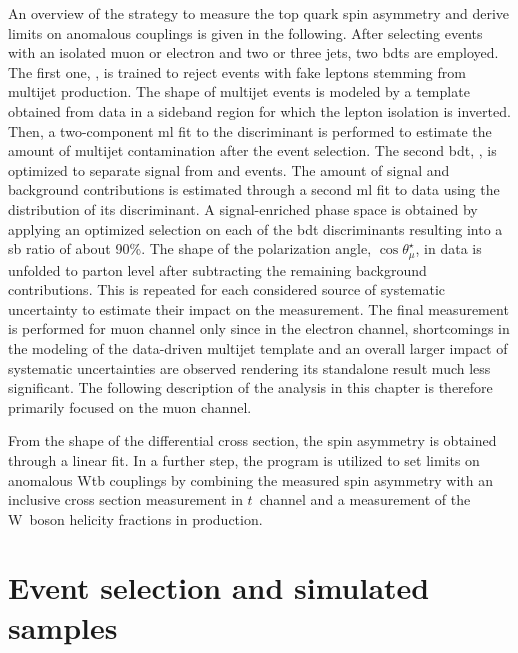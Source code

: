 An overview of the strategy to measure the top quark spin asymmetry and derive limits on anomalous couplings is given in the following. After selecting events with an isolated muon or electron and two or three jets, two \glspl{bdt} are employed. The first one, \bdtqcd, is trained to reject events with fake leptons stemming from multijet production. The shape of multijet events is modeled by a template obtained from data in a sideband region for which the lepton isolation is inverted. Then, a two-component \gls{ml} fit to the \bdtqcd discriminant is performed to estimate the amount of multijet contamination after the event selection. The second \gls{bdt}, \bdttch, is optimized to separate signal from \wjets and \ttbar events. The amount of signal and background contributions is estimated through a second \gls{ml} fit to data using the distribution of its discriminant. A signal-enriched phase space is obtained by applying an optimized selection on each of the \gls{bdt} discriminants resulting into a \gls{sb} ratio of about 90\%. The shape of the polarization angle, $\cos\theta^\star_{\mu}$, in data is unfolded to parton level after subtracting the remaining background contributions. This is repeated for each considered source of systematic uncertainty to estimate their impact on the measurement. The final measurement is performed for muon channel only since in the electron channel, shortcomings in the modeling of the data-driven multijet template and an overall larger impact of systematic uncertainties are observed rendering its standalone result much less significant. The following description of the analysis in this chapter is therefore primarily focused on the muon channel. 

From the shape of the differential cross section, the spin asymmetry is obtained through a linear fit. In a further step, the \TOPFIT program is utilized to set limits on anomalous Wtb couplings by combining the measured spin asymmetry with an inclusive cross section measurement in $t$~channel and a measurement of the W~boson helicity fractions in \ttbar production.



\section{Event selection and simulated samples}
\label{sec:polarization-selection}

